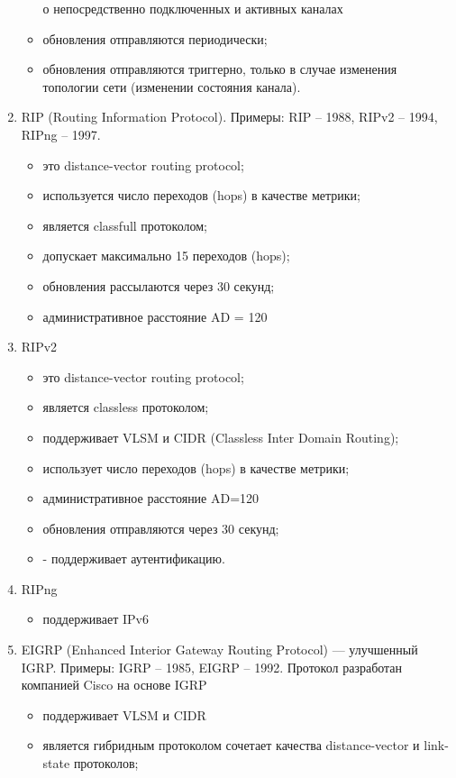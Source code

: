 \begin{enumerate}
\begin{itemize}
			о непосредственно подключенных и активных каналах
		\item обновления отправляются периодически;
		\item обновления отправляются триггерно,
			только в случае изменения топологии сети
			(изменении состояния канала).
	\end{itemize}
	\item RIP (Routing Information Protocol).
		Примеры: RIP – 1988, RIPv2 – 1994, RIPng – 1997.
	\begin{itemize}
		\item это distance-vector routing protocol;
		\item используется число переходов (hops) в качестве метрики;
		\item является classfull протоколом;
		\item допускает максимально 15 переходов (hops);
		\item обновления рассылаются через 30 секунд;
		\item административное расстояние AD = 120
	\end{itemize}
	\item RIPv2
	\begin{itemize}
		\item это distance-vector routing protocol;
		\item является classless протоколом;
		\item поддерживает VLSM и CIDR (Classless Inter Domain Routing);
		\item использует число переходов (hops) в качестве метрики;
		\item административное расстояние AD=120
		\item обновления отправляются через 30 секунд;
		\item - поддерживает аутентификацию.
	\end{itemize}
	\item RIPng
	\begin{itemize}
		\item поддерживает IPv6
	\end{itemize}
	\item EIGRP (Enhanced Interior Gateway Routing Protocol)
		--- улучшенный IGRP. Примеры: IGRP – 1985, EIGRP – 1992.
		Протокол разработан компанией Cisco на основе IGRP
	\begin{itemize}
		\item поддерживает VLSM и CIDR
		\item является гибридным протоколом сочетает качества
			distance-vector и link-state протоколов;

\end{itemize}
\end{enumerate}
